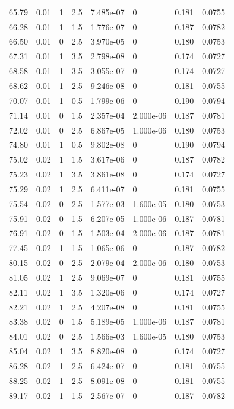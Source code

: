 \documentclass[preview]{standalone}
\begin{document}
{{{\begin{tabular}{L{1.2cm}C{1.2cm} C{0.3cm}C{0.5cm} C{1.4cm}C{1.4cm} C{1.4cm}C{1.4cm}}
  65.79  &  0.01  & 1     & 2.5 &  7.485e-07  & 0  & 0.181 &  0.0755   \\ 
  66.28  &  0.01  & 1     & 1.5 &  1.776e-07  & 0  & 0.187 &  0.0782   \\ 
  66.50  &  0.01  & 0     & 2.5 &  3.970e-05  & 0  & 0.180 &  0.0753   \\ 
  67.31  &  0.01  & 1     & 3.5 &  2.798e-08  & 0  & 0.174 &  0.0727   \\ 
  68.58  &  0.01  & 1     & 3.5 &  3.055e-07  & 0  & 0.174 &  0.0727   \\ 
  68.62  &  0.01  & 1     & 2.5 &  9.246e-08  & 0  & 0.181 &  0.0755   \\ 
  70.07  &  0.01  & 1     & 0.5 &  1.799e-06  & 0  & 0.190 &  0.0794   \\ 
  71.14  &  0.01  & 0     & 1.5 &  2.357e-04  & 2.000e-06  & 0.187 &  0.0781   \\ 
  72.02  &  0.01  & 0     & 2.5 &  6.867e-05  & 1.000e-06  & 0.180 &  0.0753   \\ 
  74.80  &  0.01  & 1     & 0.5 &  9.802e-08  & 0  & 0.190 &  0.0794   \\ 
  75.02  &  0.02  & 1     & 1.5 &  3.617e-06  & 0  & 0.187 &  0.0782   \\ 
  75.23  &  0.02  & 1     & 3.5 &  3.861e-08  & 0  & 0.174 &  0.0727   \\ 
  75.29  &  0.02  & 1     & 2.5 &  6.411e-07  & 0  & 0.181 &  0.0755   \\ 
  75.54  &  0.02  & 0     & 2.5 &  1.577e-03  & 1.600e-05  & 0.180 &  0.0753   \\ 
  75.91  &  0.02  & 0     & 1.5 &  6.207e-05  & 1.000e-06  & 0.187 &  0.0781   \\ 
  76.91  &  0.02  & 0     & 1.5 &  1.503e-04  & 2.000e-06  & 0.187 &  0.0781   \\ 
  77.45  &  0.02  & 1     & 1.5 &  1.065e-06  & 0  & 0.187 &  0.0782   \\ 
  80.15  &  0.02  & 0     & 2.5 &  2.079e-04  & 2.000e-06  & 0.180 &  0.0753   \\ 
  81.05  &  0.02  & 1     & 2.5 &  9.069e-07  & 0  & 0.181 &  0.0755   \\ 
  82.11  &  0.02  & 1     & 3.5 &  1.320e-06  & 0  & 0.174 &  0.0727   \\ 
  82.21  &  0.02  & 1     & 2.5 &  4.207e-08  & 0  & 0.181 &  0.0755   \\ 
  83.38  &  0.02  & 0     & 1.5 &  5.189e-05  & 1.000e-06  & 0.187 &  0.0781   \\ 
  84.01  &  0.02  & 0     & 2.5 &  1.566e-03  & 1.600e-05  & 0.180 &  0.0753   \\ 
  85.04  &  0.02  & 1     & 3.5 &  8.820e-08  & 0  & 0.174 &  0.0727   \\ 
  86.28  &  0.02  & 1     & 2.5 &  6.424e-07  & 0  & 0.181 &  0.0755   \\ 
  88.25  &  0.02  & 1     & 2.5 &  8.091e-08  & 0  & 0.181 &  0.0755   \\ 
  89.17  &  0.02  & 1     & 1.5 &  2.567e-07  & 0  & 0.187 &  0.0782   \\ 
\hline 
\end{tabular} 

}}}
\end{document}
